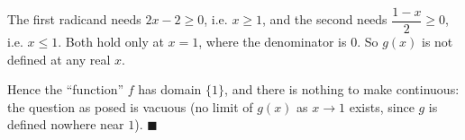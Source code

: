 The first radicand needs $2x-2\ge0$, i.e. $x\ge1$, and the second needs $\dfrac{1-x}2\ge0$, i.e. $x\le1$. Both hold only at $x=1$, where the denominator is $0$. So $g(x)$ is not defined at any real $x$.

Hence the ``function'' $f$ has domain $\{1\}$, and there is nothing to make continuous: the question as posed is vacuous (no limit of $g(x)$ as $x\to1$ exists, since $g$ is defined nowhere near $1$). $\blacksquare$
